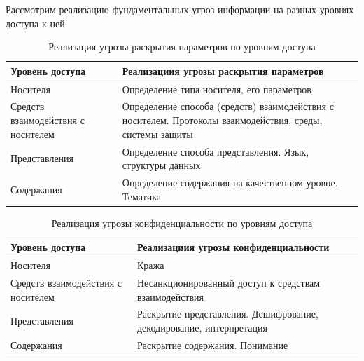 Рассмотрим реализацию фундаментальных угроз информации на разных уровнях доступа к ней. 
\begin{table}[ht]
    \caption{Реализация угрозы раскрытия параметров по уровням доступа}
    \label{t:discoverThreatByLevels}
    \centering
    \begin{tabular}[c]{|p{}|p{}|}
        \hline\hline
        Уровень доступа & 
            Реализациия угрозы раскрытия параметров\\ \hline\hline
            
        Носителя & 
            Определение типа носителя, его параметров\\ \hline
            
        Средств взаимодействия с носителем & 
            Определение способа (средств) взаимодействия с носителем. 
            Протоколы взаимодействия, среды, системы защиты\\ \hline
            
        Представления & 
            Определение способа представления. Язык, структуры данных\\ \hline
            
        Содержания & 
            Определение содержания на качественном уровне. Тематика\\ \hline
    \end{tabular}
\end{table}


\begin{table}[ht]
    \caption{Реализация угрозы конфиденциальности по уровням доступа}
    \label{t:confidThreatByLevels}
    \centering
    \begin{tabular}[c]{|p{}|p{}|}
        \hline\hline
        Уровень доступа&Реализациия угрозы конфиденциальности\\ \hline\hline
        Носителя & Кража\\ \hline
        Средств взаимодействия с носителем & Несанкционированный доступ к средствам взаимодействия\\ \hline
        Представления & Раскрытие представления. Дешифрование, декодирование, интерпретация\\ \hline
        Содержания & Раскрытие содержания. Понимание\\ \hline
    \end{tabular}
\end{table}


